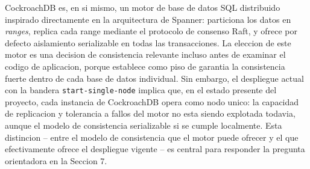 \documentclass[11pt,a4paper]{article}
\begin{document}
CockroachDB es, en si mismo, un motor de base de datos SQL distribuido inspirado directamente en la arquitectura de Spanner: particiona los datos en \emph{ranges}, replica cada range mediante el protocolo de consenso Raft, y ofrece por defecto aislamiento serializable en todas las transacciones. La eleccion de este motor es una decision de consistencia relevante incluso antes de examinar el codigo de aplicacion, porque establece como piso de garantia la consistencia fuerte dentro de cada base de datos individual. Sin embargo, el despliegue actual con la bandera \texttt{start-single-node} implica que, en el estado presente del proyecto, cada instancia de CockroachDB opera como nodo unico: la capacidad de replicacion y tolerancia a fallos del motor no esta siendo explotada todavia, aunque el modelo de consistencia serializable si se cumple localmente. Esta distincion -- entre el modelo de consistencia que el motor puede ofrecer y el que efectivamente ofrece el despliegue vigente -- es central para responder la pregunta orientadora en la Seccion 7.
\end{document}
